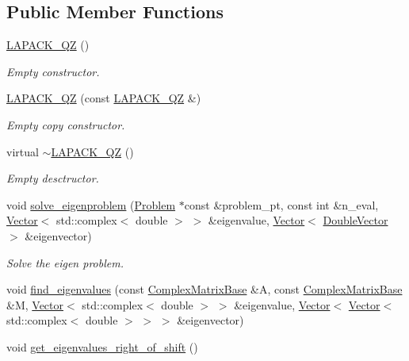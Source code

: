 \subsection*{Public Member Functions}
\begin{DoxyCompactItemize}
\item 
\hyperlink{classoomph_1_1LAPACK__QZ_ade55daae7bca3f5d40cfd523f6e0169c}{L\+A\+P\+A\+C\+K\+\_\+\+QZ} ()
\begin{DoxyCompactList}\small\item\em Empty constructor. \end{DoxyCompactList}\item 
\hyperlink{classoomph_1_1LAPACK__QZ_adf44e46b33d008972a4ef58acd19fcb2}{L\+A\+P\+A\+C\+K\+\_\+\+QZ} (const \hyperlink{classoomph_1_1LAPACK__QZ}{L\+A\+P\+A\+C\+K\+\_\+\+QZ} \&)
\begin{DoxyCompactList}\small\item\em Empty copy constructor. \end{DoxyCompactList}\item 
virtual \hyperlink{classoomph_1_1LAPACK__QZ_ab44c634b95861be02003e7f9f2a4ad3e}{$\sim$\+L\+A\+P\+A\+C\+K\+\_\+\+QZ} ()
\begin{DoxyCompactList}\small\item\em Empty desctructor. \end{DoxyCompactList}\item 
void \hyperlink{classoomph_1_1LAPACK__QZ_ae1efb27c494ea6fb0ce1267233c78f74}{solve\+\_\+eigenproblem} (\hyperlink{classoomph_1_1Problem}{Problem} $\ast$const \&problem\+\_\+pt, const int \&n\+\_\+eval, \hyperlink{classoomph_1_1Vector}{Vector}$<$ std\+::complex$<$ double $>$ $>$ \&eigenvalue, \hyperlink{classoomph_1_1Vector}{Vector}$<$ \hyperlink{classoomph_1_1DoubleVector}{Double\+Vector} $>$ \&eigenvector)
\begin{DoxyCompactList}\small\item\em Solve the eigen problem. \end{DoxyCompactList}\item 
void \hyperlink{classoomph_1_1LAPACK__QZ_aaebeec8c3d313982d20ebce117d51665}{find\+\_\+eigenvalues} (const \hyperlink{classoomph_1_1ComplexMatrixBase}{Complex\+Matrix\+Base} \&A, const \hyperlink{classoomph_1_1ComplexMatrixBase}{Complex\+Matrix\+Base} \&M, \hyperlink{classoomph_1_1Vector}{Vector}$<$ std\+::complex$<$ double $>$ $>$ \&eigenvalue, \hyperlink{classoomph_1_1Vector}{Vector}$<$ \hyperlink{classoomph_1_1Vector}{Vector}$<$ std\+::complex$<$ double $>$ $>$ $>$ \&eigenvector)
\item 
void \hyperlink{classoomph_1_1LAPACK__QZ_ad768222e9e93bcacd0602222e0ac93de}{get\+\_\+eigenvalues\+\_\+right\+\_\+of\+\_\+shift} ()
\end{DoxyCompactItemize}
